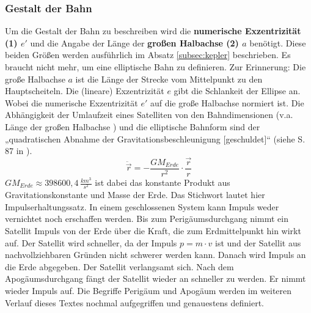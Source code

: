 \subsubsection{Gestalt der Bahn}
Um die Gestalt der Bahn zu beschreiben wird die \textbf{numerische Exzentrizität (1) \ensuremath{e'}} und die Angabe der Länge der \textbf{großen Halbachse (2) \ensuremath{a}} benötigt. Diese beiden Größen werden ausführlich im Absatz \ref{subsec:kepler} beschrieben. Es braucht nicht mehr, um eine elliptische Bahn zu definieren. Zur Erinnerung: Die große Halbachse \ensuremath{a} ist die Länge der Strecke vom Mittelpunkt zu den Hauptscheiteln. Die (lineare) Exzentrizität \ensuremath{e} gibt die Schlankeit der Ellipse an. Wobei die numerische Exzentrizität \ensuremath{e'} auf die große Halbachse normiert ist.  
\newpar
Die Abhängigkeit der Umlaufzeit eines Satelliten von den Bahndimensionen (v.a. Länge der großen Halbachse ) und die elliptische Bahnform sind der „quadratischen Abnahme der Gravitationsbeschleunigung [geschuldet]“ (siehe S. 87 in \cite{HandRaum}). 
\begin{equation}
\ddot{\vec{r}}=-\frac{GM_{Erde}}{r^2}\cdot\frac{\vec{r}}{r}
\end{equation}    
\ensuremath{GM_{Erde} \approx 398600,4\,\frac{km^3}{s^2}} ist dabei das konstante Produkt aus Gravitationskonstante und Masse der Erde. Das Stichwort lautet hier Impulserhaltungssatz. In einem geschlossenen System kann Impuls weder vernichtet noch erschaffen werden. Bis zum Perigäumsdurchgang nimmt ein Satellit Impuls von der Erde über die Kraft, die zum Erdmittelpunkt hin wirkt auf. Der Satellit wird schneller, da der Impuls \ensuremath{p=m \cdot v} ist und der Satellit aus nachvollziehbaren Gründen nicht schwerer werden kann. Danach wird Impuls an die Erde abgegeben. Der Satellit verlangsamt sich. Nach dem Apogäumsdurchgang fängt der Satellit wieder an schneller zu werden. Er nimmt wieder Impuls auf. Die Begriffe Perigäum und Apogäum werden im weiteren Verlauf dieses Textes nochmal aufgegriffen und genauestens definiert. 
  

